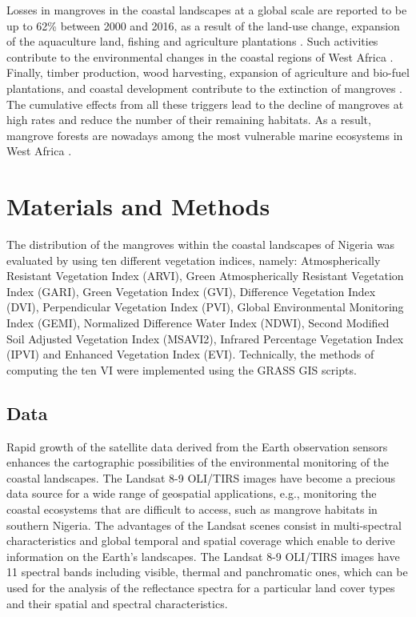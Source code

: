 \documentclass[jmse,article,submit,pdftex,moreauthors]{Definitions/mdpi}
\begin{document}
Losses in mangroves in the coastal landscapes at a global scale are reported to be up to 62\% between 2000 and 2016, as a result of the land-use change, expansion of the aquaculture land, fishing and agriculture plantations \cite{Goldberg}. Such activities contribute to the environmental changes in the coastal regions of West Africa \cite{land11111982,su12187349,Babanyara}. Finally, timber production, wood harvesting, expansion of agriculture and bio-fuel plantations, and coastal development contribute to the extinction of mangroves \cite{Feka}. The cumulative effects from all these triggers lead to the decline of mangroves at high rates and reduce the number of their remaining habitats. As a result, mangrove forests are nowadays among the most vulnerable marine ecosystems in West Africa \cite{ORIJEMIE2012360}. 

\section{Materials and Methods}

The distribution of the mangroves within the coastal landscapes of Nigeria was evaluated by using ten different vegetation indices, namely: Atmospherically Resistant Vegetation Index (ARVI), Green Atmospherically Resistant Vegetation Index (GARI), Green Vegetation Index (GVI), Difference Vegetation Index (DVI), Perpendicular Vegetation Index (PVI), Global Environmental Monitoring Index (GEMI), Normalized Difference Water Index (NDWI), Second Modified Soil Adjusted Vegetation Index (MSAVI2), Infrared Percentage Vegetation Index (IPVI) and Enhanced Vegetation Index (EVI). Technically, the methods of computing the ten VI were implemented using the GRASS GIS scripts. 

\subsection{Data}
Rapid growth of the satellite data derived from the Earth observation sensors enhances the cartographic possibilities of the environmental monitoring of the coastal landscapes. The Landsat 8-9 OLI/TIRS images have become a precious data source for a wide range of geospatial applications, e.g., monitoring the coastal ecosystems that are difficult to access, such as mangrove habitats in southern Nigeria. The advantages of the Landsat scenes consist in multi-spectral characteristics and global temporal and spatial coverage which enable to derive information on the Earth's landscapes. The Landsat 8-9 OLI/TIRS images have 11 spectral bands including visible, thermal and panchromatic ones, which can be used for the analysis of the reflectance spectra for a particular land cover types and their spatial and spectral characteristics.
\end{document}
